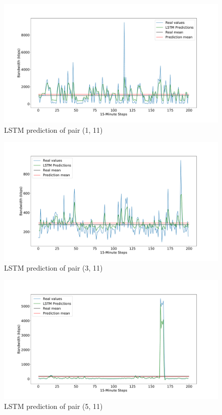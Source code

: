 	\begin{figure}[H]
		\centering
		\includegraphics[width=1\linewidth]{Pictures/Practical_Examples/LSTMprediction_0}
		\caption{LSTM prediction of pair (1, 11)}
		\label{fig:LSTMprediction_0}
	\end{figure}
	\begin{figure}[H]
		\centering
		\includegraphics[width=1\linewidth]{Pictures/Practical_Examples/LSTMprediction_2}
		\caption{LSTM prediction of pair (3, 11)}
		\label{fig:LSTMprediction_2}
	\end{figure}
	\begin{figure}[H]
		\centering
		\includegraphics[width=1\linewidth]{Pictures/Practical_Examples/LSTMprediction_4}
		\caption{LSTM prediction of pair (5, 11)}
		\label{fig:LSTMprediction_4}
	\end{figure}


